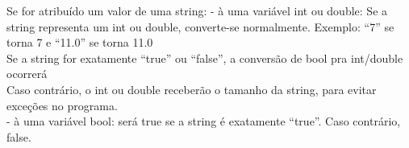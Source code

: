 \documentclass[12pt,a4paper]{article}
\begin{document}
Se for atribuído um valor de uma string:
- à uma variável int ou double: Se a string representa um int ou double, converte-se normalmente. Exemplo: ``7'' se torna 7 e ``11.0'' se torna 11.0\\
Se a string for exatamente ``true'' ou ``false'', a conversão de bool pra int/double ocorrerá\\
Caso contrário, o int ou double receberão o tamanho da string, para evitar exceções no programa.\\
- à uma variável bool: será true se a string é exatamente ``true''. Caso contrário, false.\\
\end{document}
